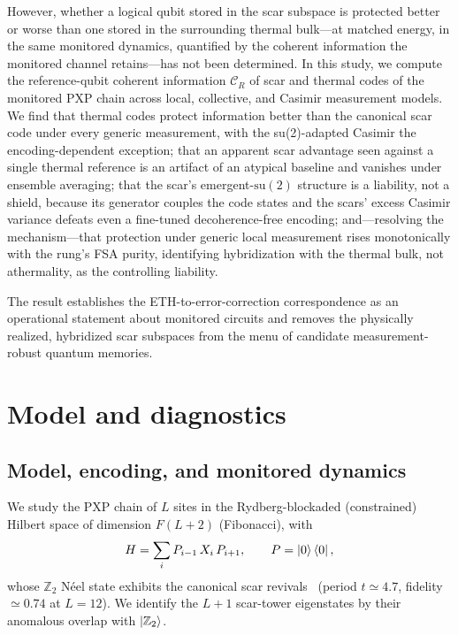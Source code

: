 \documentclass[aps,prb,twocolumn]{revtex4-2}
\newcommand{\CR}{\mathcal{C}_R}
\newcommand{\Ztwo}{\mathbb{Z}_2}
\begin{document}
However, whether a logical qubit stored in the scar subspace is protected better
or worse than one stored in the surrounding thermal bulk---at matched energy, in
the same monitored dynamics, quantified by the coherent information the
monitored channel retains---has not been determined. In this study, we compute
the reference-qubit coherent information $\CR$ of scar and thermal codes of the
monitored PXP chain across local, collective, and Casimir measurement models. We find that thermal codes protect
information better than the canonical scar code under every generic
measurement, with the su(2)-adapted Casimir the encoding-dependent
exception; that an apparent scar advantage
seen against a single thermal reference is an artifact of an atypical baseline
and vanishes under ensemble averaging; that the scar's emergent-$\mathrm{
su}(2)$ structure is a liability, not a shield, because its generator couples the
code states and the scars' excess Casimir variance defeats even a fine-tuned
decoherence-free encoding; and---resolving the mechanism---that protection
under generic local measurement rises monotonically with the rung's FSA
purity, identifying hybridization with the thermal bulk, not athermality,
as the controlling liability.

The result establishes the ETH-to-error-correction correspondence as an operational
statement about monitored circuits and removes the physically realized,
hybridized scar subspaces
from the menu of candidate measurement-robust quantum memories.

\section{Model and diagnostics}

\subsection{Model, encoding, and monitored dynamics}

We study the PXP chain of $L$ sites in the Rydberg-blockaded (constrained)
Hilbert space of dimension $F(L{+}2)$ (Fibonacci), with
\begin{equation}
H = \sum_i P_{i-1}\, X_i\, P_{i+1}, \qquad P=\ket{0}\bra{0},
\end{equation}
whose $\Ztwo$ N\'eel state exhibits the canonical scar
revivals~\cite{Bernien2017,Turner2018,Lin2019,Ho2019} (period
$t\simeq4.7$, fidelity $\simeq0.74$ at $L=12$). We identify the $L{+}1$ scar-tower
eigenstates by their anomalous overlap with $\ket{\Ztwo}$.
\end{document}
